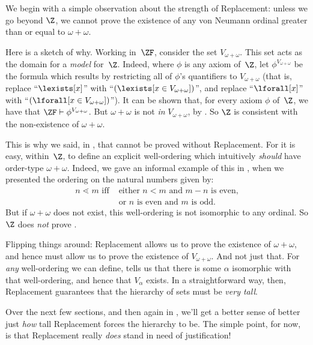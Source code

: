 \documentclass[../../../include/open-logic-section]{subfiles}
\begin{document}

We begin with a simple observation about the strength of Replacement: unless we go beyond $\Z$, we cannot prove the existence of any von Neumann
ordinal greater than or equal to $\omega + \omega$. 

Here is a sketch of
why. Working in~$\ZF$, consider the set $V_{\omega+\omega}$. This set acts
as the domain for a  \emph{model} for~$\Z$. Indeed, where $\phi$ is any
axiom of~$\Z$, let $\phi^{V_{\omega+\omega}}$ be the formula which results
by restricting all of $\phi$'s quantifiers to $V_{\omega+\omega}$ (that is,
replace ``$\lexists[x]$'' with ``$(\lexists[x \in V_{\omega+\omega}])$'', and
replace ``$\lforall[x]$'' with ``$(\lforall[x \in V_{\omega+\omega}])$''). It
can be shown that, for every axiom $\phi$ of~$\Z$, we have that $\ZF \vdash
\phi^{V_{\omega+\omega}}$. But $\omega+\omega$ is not \emph{in}
$V_{\omega+\omega}$, by  . So $\Z$ is
consistent with the non-existence of $\omega+\omega$.

This is why we said, in , that
 cannot be proved
without Replacement. For it is easy, within~$\Z$, to define an
explicit well-ordering which intuitively \emph{should} have order-type
$\omega+\omega$. Indeed, we gave an informal example of this in
, when we presented the ordering on the
natural numbers given by:
\begin{align*}
	n \lessdot m \text{ iff }&\text{either }n < m\text{ and }m-n\text{ is even,}\\
	& \text{or $n$ is even and $m$ is odd.}
\end{align*}
But if $\omega+\omega$ does not exist, this well-ordering is not
isomorphic to any ordinal. So $\Z$ does \emph{not} prove
. 

Flipping things around: Replacement allows us to prove the existence
of $\omega+\omega$, and hence must allow us to prove the existence of
$V_{\omega+\omega}$. And not just that. For \emph{any} well-ordering
we can define, 
tells us that there is some $\alpha$ isomorphic with that
well-ordering, and hence that $V_\alpha$ exists. In a straightforward
way, then, Replacement guarantees that the hierarchy of sets must be
\emph{very tall}. 

Over the next few sections, and then again in
, we'll get a better sense of better
just \emph{how} tall Replacement forces the hierarchy to be. The
simple point, for now, is that Replacement really \emph{does} stand in
need of justification!
\end{document}
